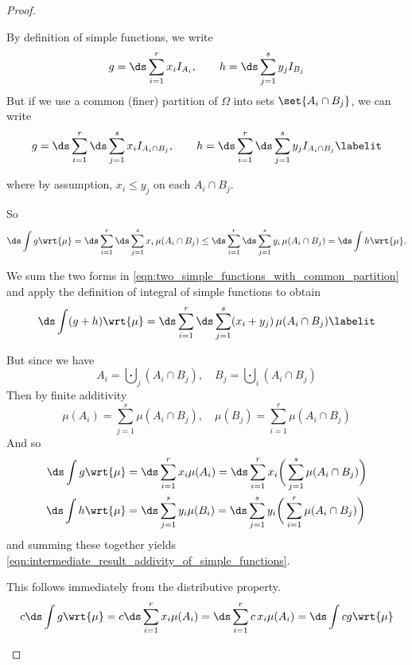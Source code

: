 \documentclass{article} %
\newif\ifActive
\begin{document}
\begin{proof}


\begin{alphabate}
\item 
\ifActive 
	\textbf{Workshop exercise:} Prove that the monotonicity property holds for integrals of simple functions.
\else 
	By definition of simple functions, we write \[g = \ds\sum_{i=1}^r x_i I_{A_i} ,\quad \quad h = \ds\sum_{j=1}^s y_j I_{B_j}  \]	
	But if we use a common (finer) partition of $\Omega$ into sets $\set{A_i \cap B_j}$, we can write
	\begin{align*}
	g = \ds\sum_{i=1}^r \ds\sum_{j=1}^s x_i I_{A_i \cap B_j} ,\quad \quad h = \ds\sum_{i=1}^r \ds\sum_{j=1}^s y_j I_{A_i \cap B_j}  
	\labelit \label{eqn:two_simple_functions_with_common_partition}
	\end{align*}
	
	where by assumption, $x_i \leq y_j$ on each $A_i \cap B_j$.	
		
	So 
	\begin{align*}
	\ds\int g \wrt{\mu}  = \ds\sum_{i=1}^r \ds\sum_{j=1}^s x_i \, \mu(A_i \cap B_j)  \leq \ds\sum_{i=1}^r \ds\sum_{j=1}^s y_i \, \mu(A_i \cap B_j) = \ds\int h \wrt{\mu}.
	\end{align*}
\fi 
\item We sum the two forms in \eqref{eqn:two_simple_functions_with_common_partition} and apply the definition of integral of simple functions to obtain
\begin{align*}
\ds\int (g+h) \wrt{\mu} = \ds\sum_{i=1}^r \ds\sum_{j=1}^s (x_i + y_j) \, \mu(A_i \cap B_j)
\labelit \label{eqn:intermediate_result_addivity_of_simple_functions}
\end{align*}

But since we have 
\[A_i =\bigcupdot_j (A_i \cap B_j), \quad  B_j =\bigcupdot_i (A_i \cap B_j)\]
Then by finite additivity
\[\mu(A_i) =\sum_{j=1}^s \mu(A_i \cap B_j), \quad  \mu(B_j) =\sum_{i=1}^r \mu(A_i \cap B_j)\]
And so
\begin{align*}
\ds\int g \wrt{\mu} &= \ds\sum_{i=1}^r x_i \mu(A_i) = \ds\sum_{i=1}^r x_i \bigg(\sum_{j=1}^s \mu(A_i \cap B_j)\bigg) \\	
\ds\int h \wrt{\mu} &= \ds\sum_{j=1}^s y_i \mu(B_i) = \ds\sum_{j=1}^s y_i \bigg(\sum_{i=1}^r \mu(A_i \cap B_j)\bigg) \\	
\end{align*}
and summing these together yields \eqref{eqn:intermediate_result_addivity_of_simple_functions}.
\item This follows immediately from the distributive property.
\[ c \ds\int g \wrt{\mu} = c \ds\sum_{i=1}^r x_i \mu(A_i) =  \ds\sum_{i=1}^r c \, x_i \mu(A_i) = \ds\int cg \wrt{\mu} \]
\end{alphabate}

\end{proof}
\end{document}
